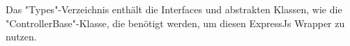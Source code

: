 
Das "Types"-Verzeichnis enthält die Interfaces und abstrakten Klassen, wie die "ControllerBase"-Klasse, die benötigt werden, um diesen ExpressJs Wrapper zu nutzen.
